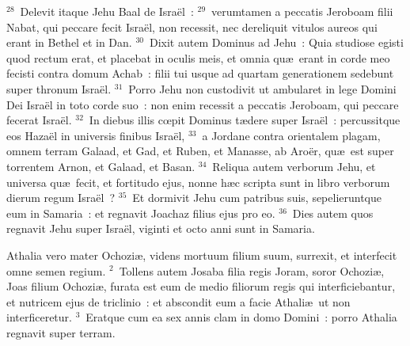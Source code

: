 ${}^{28}$~Delevit itaque Jehu Baal de Isra\"el~:
${}^{29}$~verumtamen a peccatis Jeroboam filii Nabat, qui peccare fecit Isra\"el, non recessit, nec dereliquit vitulos aureos qui erant in Bethel et in Dan.
${}^{30}$~Dixit autem Dominus ad Jehu~: Quia studiose egisti quod rectum erat, et placebat in oculis meis, et omnia qu\ae\ erant in corde meo fecisti contra domum Achab~: filii tui usque ad quartam generationem sedebunt super thronum Isra\"el.
${}^{31}$~Porro Jehu non custodivit ut ambularet in lege Domini Dei Isra\"el in toto corde suo~: non enim recessit a peccatis Jeroboam, qui peccare fecerat Isra\"el.
${}^{32}$~In diebus illis cœpit Dominus t\ae dere super Isra\"el~: percussitque eos Haza\"el in universis finibus Isra\"el,
${}^{33}$~a Jordane contra orientalem plagam, omnem terram Galaad, et Gad, et Ruben, et Manasse, ab Aro\"er, qu\ae\ est super torrentem Arnon, et Galaad, et Basan.
${}^{34}$~Reliqua autem verborum Jehu, et universa qu\ae\ fecit, et fortitudo ejus, nonne h\ae c scripta sunt in libro verborum dierum regum Isra\"el~?
${}^{35}$~Et dormivit Jehu cum patribus suis, sepelieruntque eum in Samaria~: et regnavit Joachaz filius ejus pro eo.
${}^{36}$~Dies autem quos regnavit Jehu super Isra\"el, viginti et octo anni sunt in Samaria.

\bchapter
\lettrine[lines=3,image=true,loversize=0.05,lraise=-0.03]{A}{}thalia vero mater Ochozi\ae , videns mortuum filium suum, surrexit, et interfecit omne semen regium.
${}^{2}$~Tollens autem Josaba filia regis Joram, soror Ochozi\ae , Joas filium Ochozi\ae , furata est eum de medio filiorum regis qui interficiebantur, et nutricem ejus de triclinio~: et abscondit eum a facie Athali\ae\ ut non interficeretur.
${}^{3}$~Eratque cum ea sex annis clam in domo Domini~: porro Athalia regnavit super terram.


